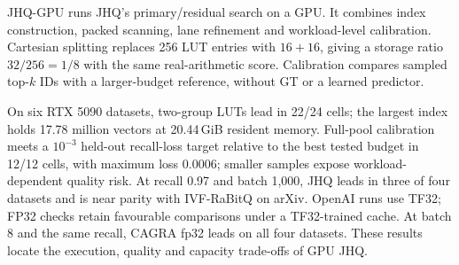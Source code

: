 JHQ-GPU runs JHQ's primary/residual search on a GPU. It combines index construction, packed scanning, lane refinement and workload-level calibration. Cartesian splitting replaces 256 LUT entries with $16+16$, giving a storage ratio $32/256=1/8$ with the same real-arithmetic score. Calibration compares sampled top-$k$ IDs with a larger-budget reference, without GT or a learned predictor.

On six RTX 5090 datasets, two-group LUTs lead in 22/24 cells; the largest index holds 17.78 million vectors at 20.44\,GiB resident memory. Full-pool calibration meets a $10^{-3}$ held-out
recall-loss target relative to the best tested budget in 12/12 cells, with
maximum loss 0.0006; smaller samples expose workload-dependent quality risk.
At recall 0.97 and batch 1,000, JHQ leads in three of four datasets and is
near parity with IVF-RaBitQ on arXiv. OpenAI runs use TF32; FP32 checks
retain favourable comparisons under a TF32-trained cache. At batch 8 and
the same recall, CAGRA fp32 leads on all four datasets. These results
locate the execution, quality and capacity trade-offs of GPU JHQ.
